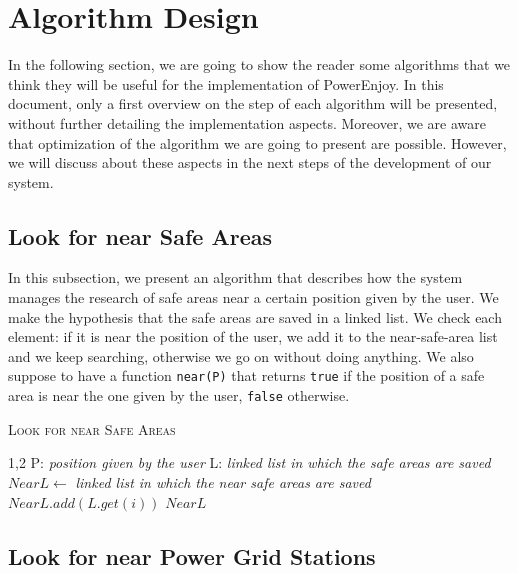 \section{Algorithm Design} \label{sec:algo}

In the following section, we are going to show the reader some algorithms that we think they will be useful for the implementation of PowerEnjoy.
In this document, only a first overview on the step of each algorithm will be presented, without further detailing the implementation aspects. Moreover, we are aware that optimization of the algorithm we are going to present are possible.
However, we will discuss about these aspects in the next steps of the development of our system.

\subsection{Look for near Safe Areas} \label{subsec:near-safe-area}

In this subsection, we present an algorithm that describes how the system manages the research of safe areas near a certain position given by the user. 
We make the hypothesis that the safe areas are saved in a linked list.
We check each element: if it is near the position of the user, we add it to the near-safe-area list and we keep searching, otherwise we go on without doing anything.
We also suppose to have a function \texttt{near(P)} that returns \texttt{true} if the position of a safe area is near the one given by the user, \texttt{false} otherwise.

\vspace{32pt}
\begin{algorithm}[h!tb]
\caption{\textsc{Look for near Safe Areas}}
\label{alg:near-safe-area}
\begin{algorithmic}[1]
\begin{spacing}{1,2}
\State P: \textit{position given by the user}
\State L: \textit{linked list in which the safe areas are saved}
\State $NearL \leftarrow $ \textit{linked list in which the near safe areas are saved}
		\State $NearL.add(L.get(i))$
	\EndIf
\EndFor
\State\Return $NearL$
\EndFunction
\end{spacing}
\end{algorithmic}
\end{algorithm}

\clearpage

\subsection{Look for near Power Grid Stations} \label{subsec:near-stations}

